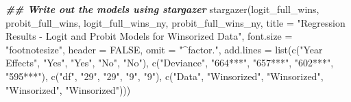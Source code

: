 \documentclass[a4paper,nobind]{templates/ociamthesis}
\newenvironment{Shaded}{\begin{snugshade}}{\end{snugshade}}
\newcommand{\AttributeTok}[1]{\textcolor[rgb]{0.77,0.63,0.00}{#1}}
\newcommand{\ConstantTok}[1]{\textcolor[rgb]{0.00,0.00,0.00}{#1}}
\newcommand{\DocumentationTok}[1]{\textcolor[rgb]{0.56,0.35,0.01}{\textbf{\textit{#1}}}}
\newcommand{\FunctionTok}[1]{\textcolor[rgb]{0.00,0.00,0.00}{#1}}
\newcommand{\NormalTok}[1]{#1}
\newcommand{\StringTok}[1]{\textcolor[rgb]{0.31,0.60,0.02}{#1}}
\renewenvironment{Shaded}
{
  \vspace{10pt}%
  \begin{snugshade}%
}{%
  \end{snugshade}%
  \vspace{8pt}%
}
\begin{document}
\begin{Shaded}
\begin{Highlighting}[]
\DocumentationTok{\#\# Write out the models using stargazer}
\FunctionTok{stargazer}\NormalTok{(logit\_full\_wins, probit\_full\_wins, logit\_full\_wins\_ny, probit\_full\_wins\_ny, }\AttributeTok{title =} \StringTok{"Regression Results {-} Logit and Probit Models for Winsorized Data"}\NormalTok{, }\AttributeTok{font.size =} \StringTok{"footnotesize"}\NormalTok{, }\AttributeTok{header =} \ConstantTok{FALSE}\NormalTok{, }\AttributeTok{omit =} \StringTok{"\^{}factor."}\NormalTok{, }\AttributeTok{add.lines =} \FunctionTok{list}\NormalTok{(}\FunctionTok{c}\NormalTok{(}\StringTok{"Year Effects"}\NormalTok{, }\StringTok{"Yes"}\NormalTok{, }\StringTok{"Yes"}\NormalTok{, }\StringTok{"No"}\NormalTok{, }\StringTok{"No"}\NormalTok{),                      }
\FunctionTok{c}\NormalTok{(}\StringTok{"Deviance"}\NormalTok{, }\StringTok{"664***"}\NormalTok{, }\StringTok{"657***"}\NormalTok{, }\StringTok{"602***"}\NormalTok{, }\StringTok{"595***"}\NormalTok{), }\FunctionTok{c}\NormalTok{(}\StringTok{"df"}\NormalTok{, }\StringTok{"29"}\NormalTok{, }\StringTok{"29"}\NormalTok{, }\StringTok{"9"}\NormalTok{, }\StringTok{"9"}\NormalTok{), }\FunctionTok{c}\NormalTok{(}\StringTok{"Data"}\NormalTok{, }\StringTok{"Winsorized"}\NormalTok{, }\StringTok{"Winsorized"}\NormalTok{, }\StringTok{"Winsorized"}\NormalTok{, }\StringTok{"Winsorized"}\NormalTok{)))}
\end{Highlighting}
\end{Shaded}
\end{document}
